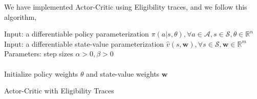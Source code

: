 \documentclass[11pt]{article}
\begin{document}
We have implemented Actor-Critic using Eligibility traces, and we follow this algorithm,\cite{RLbook}
\begin{algorithm}[!h]
\SetAlgoLined
    Input: a differentiable policy parameterization $\pi(a | s, \theta), \forall a \in \mathcal{A}, s \in \mathcal{S}, \theta \in \mathbb{R}^{n}$\\
    Input: a differentiable state-value parameterization  $\hat{v}(s, \mathbf{w}), \forall s \in \mathcal{S}, \mathbf{w} \in \mathbb{R}^{m}$\\
    Parameters: step sizes $\alpha > 0, \beta > 0$ \\
    \\
    Initialize policy weights $\theta$ and state-value weights $\mathbf{w}$ 

 \caption{Actor-Critic with Eligibility Traces}
\end{algorithm}










%
%
\end{document}
